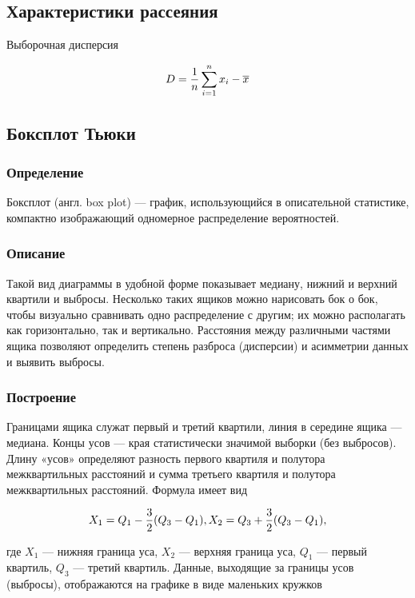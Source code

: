 \documentclass[12pt,a4paper]{scrartcl}
\begin{document}
\subsection{Характеристики рассеяния}
Выборочная дисперсия

\begin{equation}\label{eq:samplevariance}
\centering
D = \frac{1}{n} \sum_{i=1}^{n} x_i - \overline x
\end{equation}

\subsection{Боксплот Тьюки}
\subsubsection{Определение}

Боксплот (англ. box plot) — график, использующийся в описательной статистике, компактно изображающий одномерное распределение вероятностей.

\subsubsection{Описание}

Такой вид диаграммы в удобной форме показывает медиану, нижний и верхний квартили и выбросы. Несколько таких ящиков можно нарисовать бок
о бок, чтобы визуально сравнивать одно распределение с другим; их можно располагать как горизонтально, так и вертикально. Расстояния между
различными частями ящика позволяют определить степень разброса (дисперсии) и асимметрии данных и выявить выбросы.

\subsubsection{Построение}

Границами ящика служат первый и третий квартили, линия в середине
ящика — медиана. Концы усов — края статистически значимой выборки
(без выбросов). Длину «усов» определяют разность первого квартиля и полутора межквартильных расстояний и сумма третьего квартиля и полутора
межквартильных расстояний. Формула имеет вид

\begin{equation}\label{eq:borders}
\centering
X_1 = Q_1 - \frac{3}{2}(Q_3 - Q_1), X_2 = Q_3 + \frac{3}{2}(Q_3 - Q_1),
\end{equation}

где $X_1$ — нижняя граница уса, $X_2$ — верхняя граница уса, $Q_1$ — первый
квартиль, $Q_3$ — третий квартиль.
Данные, выходящие за границы усов (выбросы), отображаются на графике
в виде маленьких кружков
\end{document}
